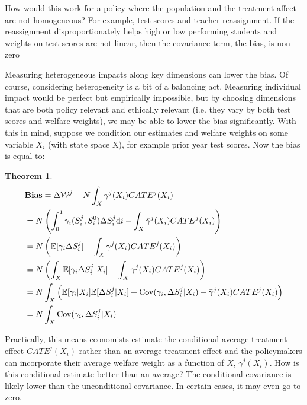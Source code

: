 \documentclass[12pt]{article}
\theoremstyle{definition}
\theoremstyle{definition}
\theoremstyle{definition}
\theoremstyle{definition}
\newtheorem{thm}{Theorem}
\begin{document}
    How would this work for a policy where the population and the treatment affect are not homogeneous?  For example, test scores and teacher reassignment. If the reassignment disproportionately helps high or low performing students and weights on test scores are not linear, then the covariance term, the bias, is non-zero

 Measuring heterogeneous impacts along key dimensions can lower the bias. Of course, considering heterogeneity is a bit of a balancing act. Measuring individual impact would be perfect but empirically impossible, but by choosing dimensions that are both policy relevant and ethically relevant (i.e. they vary by both test scores and welfare weights), we may be able to lower the bias significantly. With this in mind, suppose we condition our estimates and welfare weights on some variable $X_i$ (with state space X), for example prior year test scores. Now the bias is equal to:



    \begin{thm}
    \label{cond_exp_1}
        \begin{align*}
       & \textbf{Bias} = \Delta \mathcal{W}^j - N \int_X \bar{\gamma}^j(X_i) CATE^j(X_i) \\
       & =  N \left( \int_0^1 \gamma_i(S_i^j, S_i^0) \Delta S^j_i \text{d}i - \int_X \bar{\gamma}^j(X_i) CATE^j(X_i) \right)  \\
      & =  N \left( \mathbb{E}[\gamma_i \Delta S^j_i] - \int_X \bar{\gamma}^j(X_i) CATE^j(X_i) \right) \\
        & = N \left( \int_X \mathbb{E}[\gamma_i \Delta S^j_i| X_i] - \int_X \bar{\gamma}^j(X_i) CATE^j(X_i) \right)  \\
       & = N \int_X \left(  \mathbb{E}[\gamma_i| X_i] \mathbb{E}[\Delta S^j_i| X_i] + \mathrm{Cov}(\gamma_i, \Delta S^j_i| X_i) - \bar{\gamma}^j(X_i) CATE^j(X_i) \right) \\
       & = N \int_X \mathrm{Cov}(\gamma_i, \Delta S^j_i| X_i)
    \end{align*}
    \end{thm}
    
    Practically, this means economists estimate the conditional average treatment effect $ CATE^j(X_i)$ rather than an average treatment effect and the policymakers can incorporate their average welfare weight as a function of $X$,  $\bar{\gamma}^j(X_i)$.  How is this conditional estimate better than an average? The conditional covariance is likely lower than the unconditional covariance. In certain cases, it may even go to zero. 
    
\end{document}
